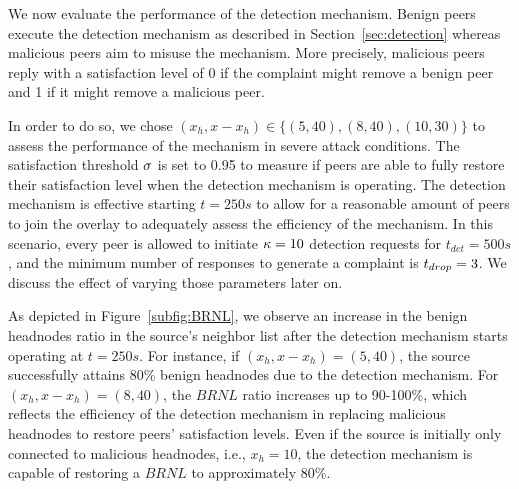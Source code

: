 

We now evaluate the performance of the detection mechanism.
Benign peers execute the detection mechanism as described in Section~\ref{sec:detection} whereas malicious peers aim to misuse the mechanism.
More precisely, malicious peers reply with a satisfaction level of 0 if the complaint might remove a benign peer and 1 if it might remove a malicious peer. 

In order to do so, we chose $(x_h, x-x_h) \in \{(5, 40), (8, 40), (10, 30)\}$ to assess the performance of the mechanism in severe attack conditions.
The satisfaction threshold $\sigma$ is set to 0.95 to measure if peers are able to fully restore their satisfaction level when the detection mechanism is operating.
The detection mechanism is effective starting $t=250s$ to allow for a reasonable amount of peers to join the overlay to adequately assess the efficiency of the mechanism.
In this scenario, every peer is allowed to initiate $\kappa=10$ detection requests for $t_{det}=500s$, and the minimum number of responses to generate a complaint is $t_{drop}=3$. 
We discuss the effect of varying those parameters later on.

As depicted in Figure~\ref{subfig:BRNL}, we observe an increase in the benign headnodes ratio in the source's neighbor list after the detection mechanism starts operating at $t=250s$.  
For instance, if $(x_h, x-x_h)=(5, 40)$, the source successfully attains 80\% benign headnodes due to the detection mechanism.
For $(x_h, x-x_h)=(8, 40)$, the $BRNL$ ratio increases up to 90-100\%, which reflects the efficiency of the detection mechanism in replacing malicious headnodes to restore peers' satisfaction levels. 
Even if the source is initially only connected to malicious headnodes, i.e., $x_h=10$, the detection mechanism is capable of restoring a $BRNL$ to approximately 80\%. 

